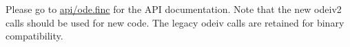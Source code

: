 Please go to \hyperlink{ode_8finc}{api/ode.\+finc} for the A\+P\+I documentation. Note that the new odeiv2 calls should be used for new code. The legacy odeiv calls are retained for binary compatibility. 